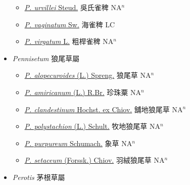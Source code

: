 \begin{itemize}
\begin{itemize}
        \item[] \href{http://www.theplantlist.org/tpl1.1/search?q=Paspalum+urvillei}{\textit{P. urvillei} Steud.}   吳氏雀稗 NA$^n$
        \item[] \href{http://www.theplantlist.org/tpl1.1/search?q=Paspalum+vaginatum}{\textit{P. vaginatum} Sw.}   海雀稗 LC
        \item[] \href{http://www.theplantlist.org/tpl1.1/search?q=Paspalum+virgatum}{\textit{P. virgatum} L.}   粗桿雀稗 NA$^n$
  \end{itemize}
 \item[] \textit{Pennisetum} 狼尾草屬
                    
  \begin{itemize}
        \item[] \href{http://www.theplantlist.org/tpl1.1/search?q=Pennisetum+alopecuroides}{\textit{P. alopecuroides} (L.) Spreng.}   狼尾草 NA$^n$
        \item[] \href{http://www.theplantlist.org/tpl1.1/search?q=Pennisetum+amiricanum}{\textit{P. amiricanum} (L.) R.Br.}   珍珠粟 NA$^n$
        \item[] \href{http://www.theplantlist.org/tpl1.1/search?q=Pennisetum+clandestinum}{\textit{P. clandestinum} Hochst. ex Chiov.}   舖地狼尾草 NA$^n$
        \item[] \href{http://www.theplantlist.org/tpl1.1/search?q=Pennisetum+polystachion}{\textit{P. polystachion} (L.) Schult.}   牧地狼尾草 NA$^n$
        \item[] \href{http://www.theplantlist.org/tpl1.1/search?q=Pennisetum+purpureum}{\textit{P. purpureum} Schumach.}   象草 NA$^n$
        \item[] \href{http://www.theplantlist.org/tpl1.1/search?q=Pennisetum+setaceum}{\textit{P. setaceum} (Forssk.) Chiov.}   羽絨狼尾草 NA$^n$
  \end{itemize}
 \item[] \textit{Perotis} 茅根草屬
                    

\end{itemize}
